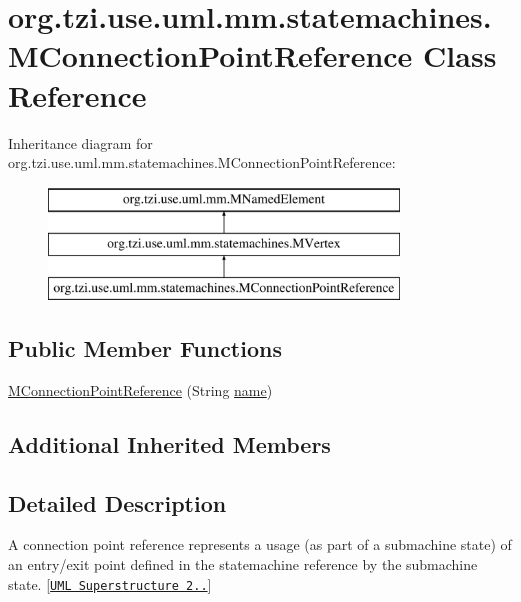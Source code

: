 \hypertarget{classorg_1_1tzi_1_1use_1_1uml_1_1mm_1_1statemachines_1_1_m_connection_point_reference}{\section{org.\-tzi.\-use.\-uml.\-mm.\-statemachines.\-M\-Connection\-Point\-Reference Class Reference}
\label{classorg_1_1tzi_1_1use_1_1uml_1_1mm_1_1statemachines_1_1_m_connection_point_reference}
}
Inheritance diagram for org.\-tzi.\-use.\-uml.\-mm.\-statemachines.\-M\-Connection\-Point\-Reference\-:\begin{figure}[H]
\begin{center}
\leavevmode
\includegraphics[height=3.000000cm]{classorg_1_1tzi_1_1use_1_1uml_1_1mm_1_1statemachines_1_1_m_connection_point_reference}
\end{center}
\end{figure}
\subsection*{Public Member Functions}
\begin{DoxyCompactItemize}
\item 
\hyperlink{classorg_1_1tzi_1_1use_1_1uml_1_1mm_1_1statemachines_1_1_m_connection_point_reference_a4ba86a9ee96c7262d5f3d2a3ae81ca90}{M\-Connection\-Point\-Reference} (String \hyperlink{classorg_1_1tzi_1_1use_1_1uml_1_1mm_1_1statemachines_1_1_m_vertex_a9bb884a76140732039ff1fbf631b6575}{name})
\end{DoxyCompactItemize}
\subsection*{Additional Inherited Members}


\subsection{Detailed Description}
A connection point reference represents a usage (as part of a submachine state) of an entry/exit point defined in the statemachine reference by the submachine state. \mbox{[}\href{http://www.omg.org/spec/UML/}{\tt U\-M\-L Superstructure 2..}\mbox{]}

